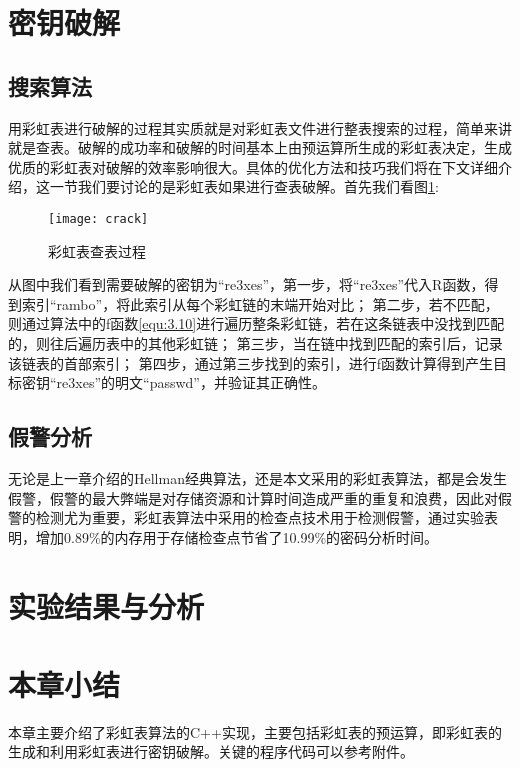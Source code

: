 \section{密钥破解}
\subsection{搜索算法}
用彩虹表进行破解的过程其实质就是对彩虹表文件进行整表搜索的过程，简单来讲就是查表。破解的成功率和破解的时间基本上由预运算所生成的彩虹表决定，生成优质的彩虹表对破解的效率影响很大。具体的优化方法和技巧我们将在下文详细介绍，这一节我们要讨论的是彩虹表如果进行查表破解。首先我们看图\ref{fig:4.3}:
\begin{figure}[!ht]
\centering
\texttt{[image: crack]}
\caption{彩虹表查表过程}
\label{fig:4.3}
\end{figure}

从图中我们看到需要破解的密钥为“re3xes”，第一步，将“re3xes”代入R函数，得到索引“rambo”，将此索引从每个彩虹链的末端开始对比；
第二步，若不匹配，则通过算法中的f函数\eqref{equ:3.10}进行遍历整条彩虹链，若在这条链表中没找到匹配的，则往后遍历表中的其他彩虹链；
第三步，当在链中找到匹配的索引后，记录该链表的首部索引；
第四步，通过第三步找到的索引，进行f函数计算得到产生目标密钥“re3xes”的明文“passwd”，并验证其正确性。
\subsection{假警分析}
无论是上一章介绍的Hellman经典算法，还是本文采用的彩虹表算法，都是会发生假警，假警的最大弊端是对存储资源和计算时间造成严重的重复和浪费，因此对假警的检测尤为重要，彩虹表算法中采用的检查点技术用于检测假警，通过实验表明，增加0.89\%的内存用于存储检查点节省了10.99\%的密码分析时间。
\section{实验结果与分析}

\section{本章小结}
本章主要介绍了彩虹表算法的C++实现，主要包括彩虹表的预运算，即彩虹表的生成和利用彩虹表进行密钥破解。关键的程序代码可以参考附件。

